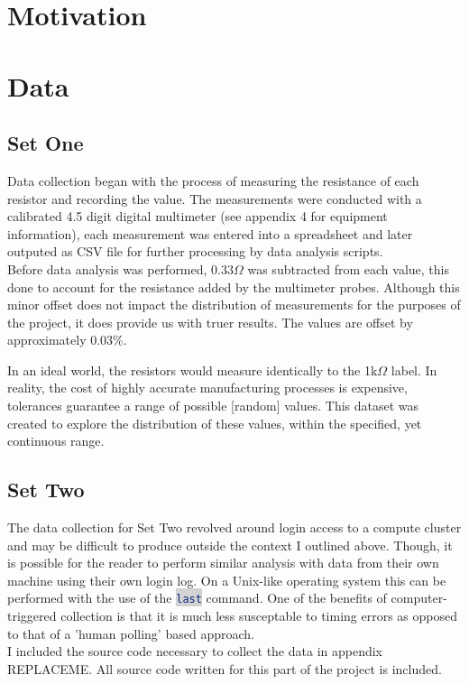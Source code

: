 \documentclass[10.5pt]{report}
\newcommand{\inlinecode}[2]{\colorbox{lightgray}{\lstinline[language=#1]$#2$}}
\begin{document}
\section*{Motivation}





\section*{Data}

\subsection*{Set One}

Data collection began with the process of measuring the resistance of each resistor
and recording the value. The measurements were conducted with a calibrated 4.5 digit
digital multimeter (see appendix 4 for equipment information), each measurement was entered
into a spreadsheet and later outputed as CSV file for further processing by data analysis scripts. \\
Before data analysis was performed, $0.33\Omega$ was subtracted from each value, this done to account
for the resistance added by the multimeter probes. Although this minor offset does not impact the
distribution of measurements for the purposes of the project, it does provide us with truer results. 
The values are offset by approximately 0.03\%. 

In an ideal world, the resistors would measure identically to the 1k$\Omega$ label. 
In reality, the cost of highly accurate manufacturing processes is expensive, 
tolerances guarantee a range of possible [random] values. This dataset was created to explore 
the distribution of these values, within the specified, yet continuous
range.  

\subsection*{Set Two}

The data collection for Set Two revolved around login access to a compute cluster 
and may be difficult to produce outside the context I outlined above. Though, it is
possible for the reader to perform similar analysis with data from their own machine using 
their own login log. On a Unix-like operating system this can be performed with the use of the 
\inlinecode{Bash}{last} command. One of the benefits of computer-triggered collection is that it 
is much less susceptable to timing errors as opposed to that of a 'human polling' based approach. \\
I included the source code necessary to collect the data in appendix REPLACEME. All source code written 
for this part of the project is included.
\end{document}
